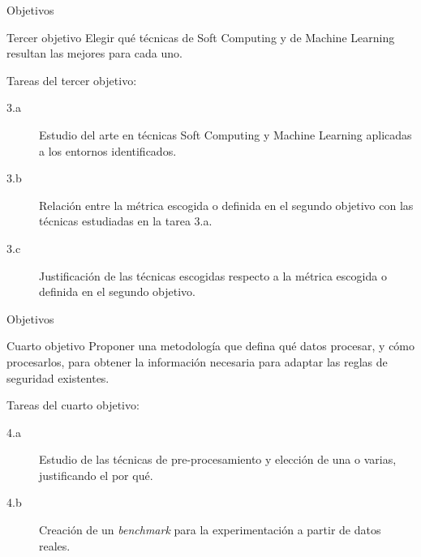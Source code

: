 \documentclass{beamer}
\begin{document}
\begin{frame}{Objetivos}

\begin{block}{Tercer objetivo}
Elegir qué técnicas de Soft Computing y de Machine Learning resultan las mejores para cada uno.
\end{block}

Tareas del tercer objetivo:

\begin{small}
\begin{description}
  \item[3.a] Estudio del arte en técnicas Soft Computing y Machine Learning aplicadas a los entornos identificados.
  \item[3.b] Relación entre la métrica escogida o definida en el segundo objetivo con las técnicas estudiadas en la tarea 3.a.
  \item[3.c] Justificación de las técnicas escogidas respecto a la métrica escogida o definida en el segundo objetivo.
\end{description}
\end{small}

\end{frame}

\begin{frame}{Objetivos}

\begin{block}{Cuarto objetivo}
Proponer una metodología que defina qué datos procesar, y cómo procesarlos, para obtener la información necesaria para adaptar las reglas de seguridad existentes.
\end{block}

Tareas del cuarto objetivo:

\begin{small}
\begin{description}
  \item[4.a] Estudio de las técnicas de pre-procesamiento y elección de una o varias, justificando el por qué.
  \item[4.b] Creación de un \textit{benchmark} para la experimentación a partir de datos reales.
\end{description}
\end{small}

\end{frame}
\end{document}
